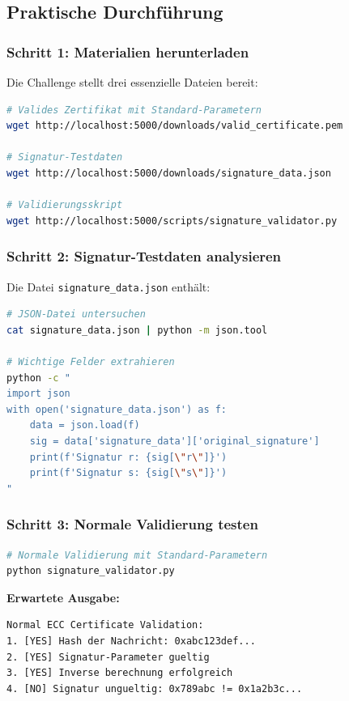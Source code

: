 \documentclass{article}
\begin{document}
\subsection{Praktische Durchführung}

\subsubsection{Schritt 1: Materialien herunterladen}

Die Challenge stellt drei essenzielle Dateien bereit:

\begin{lstlisting}[language=bash, caption=Download der Challenge-Materialien]
# Valides Zertifikat mit Standard-Parametern
wget http://localhost:5000/downloads/valid_certificate.pem

# Signatur-Testdaten 
wget http://localhost:5000/downloads/signature_data.json

# Validierungsskript
wget http://localhost:5000/scripts/signature_validator.py
\end{lstlisting}

\subsubsection{Schritt 2: Signatur-Testdaten analysieren}

Die Datei \texttt{signature\_data.json} enthält:

\begin{lstlisting}[language=bash, caption=Analyse der Testdaten]
# JSON-Datei untersuchen
cat signature_data.json | python -m json.tool

# Wichtige Felder extrahieren
python -c "
import json
with open('signature_data.json') as f:
    data = json.load(f)
    sig = data['signature_data']['original_signature']
    print(f'Signatur r: {sig[\"r\"]}')
    print(f'Signatur s: {sig[\"s\"]}')
"
\end{lstlisting}

\subsubsection{Schritt 3: Normale Validierung testen}

\begin{lstlisting}[language=bash, caption=Baseline-Validierung]
# Normale Validierung mit Standard-Parametern
python signature_validator.py
\end{lstlisting}

\textbf{Erwartete Ausgabe:}
\begin{lstlisting}[caption=Normale Validierung]
Normal ECC Certificate Validation:
1. [YES] Hash der Nachricht: 0xabc123def...
2. [YES] Signatur-Parameter gueltig
3. [YES] Inverse berechnung erfolgreich  
4. [NO] Signatur ungueltig: 0x789abc != 0x1a2b3c...
\end{lstlisting}
\end{document}
